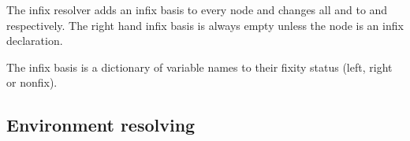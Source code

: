 The infix resolver adds an infix basis to every node and changes all
 and  to  and 
respectively. The right hand infix basis is always empty unless the node is an infix
declaration.

The infix basis is a dictionary of variable names to their fixity status (left,
right or nonfix).

\subsection{Environment resolving}



 


